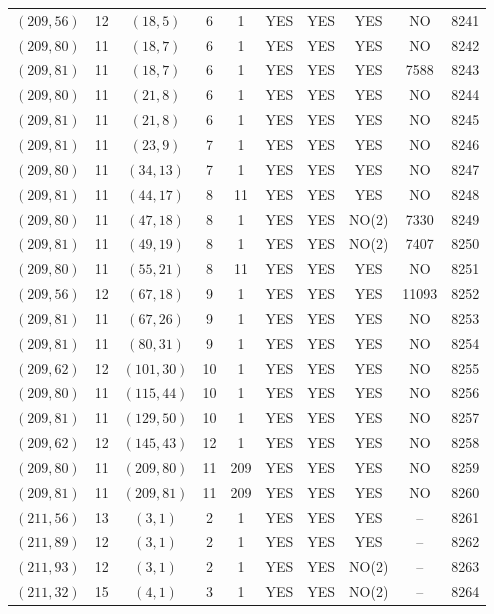 \begin{longtable}{|c|c|c|c|c|c|c|c|c|c|}
$(209, 56)$ & 12 & $(18, 5)$ & 6 & 1 & YES & YES & YES & NO & 8241\\
$(209, 80)$ & 11 & $(18, 7)$ & 6 & 1 & YES & YES & YES & NO & 8242\\
$(209, 81)$ & 11 & $(18, 7)$ & 6 & 1 & YES & YES & YES & 7588 & 8243\\
$(209, 80)$ & 11 & $(21, 8)$ & 6 & 1 & YES & YES & YES & NO & 8244\\
$(209, 81)$ & 11 & $(21, 8)$ & 6 & 1 & YES & YES & YES & NO & 8245\\
$(209, 81)$ & 11 & $(23, 9)$ & 7 & 1 & YES & YES & YES & NO & 8246\\
$(209, 80)$ & 11 & $(34, 13)$ & 7 & 1 & YES & YES & YES & NO & 8247\\
$(209, 81)$ & 11 & $(44, 17)$ & 8 & 11 & YES & YES & YES & NO & 8248\\
$(209, 80)$ & 11 & $(47, 18)$ & 8 & 1 & YES & YES & NO(2) & 7330 & 8249\\
$(209, 81)$ & 11 & $(49, 19)$ & 8 & 1 & YES & YES & NO(2) & 7407 & 8250\\
$(209, 80)$ & 11 & $(55, 21)$ & 8 & 11 & YES & YES & YES & NO & 8251\\
$(209, 56)$ & 12 & $(67, 18)$ & 9 & 1 & YES & YES & YES & 11093 & 8252\\
$(209, 81)$ & 11 & $(67, 26)$ & 9 & 1 & YES & YES & YES & NO & 8253\\
$(209, 81)$ & 11 & $(80, 31)$ & 9 & 1 & YES & YES & YES & NO & 8254\\
$(209, 62)$ & 12 & $(101, 30)$ & 10 & 1 & YES & YES & YES & NO & 8255\\
$(209, 80)$ & 11 & $(115, 44)$ & 10 & 1 & YES & YES & YES & NO & 8256\\
$(209, 81)$ & 11 & $(129, 50)$ & 10 & 1 & YES & YES & YES & NO & 8257\\
$(209, 62)$ & 12 & $(145, 43)$ & 12 & 1 & YES & YES & YES & NO & 8258\\
$(209, 80)$ & 11 & $(209, 80)$ & 11 & 209 & YES & YES & YES & NO & 8259\\
$(209, 81)$ & 11 & $(209, 81)$ & 11 & 209 & YES & YES & YES & NO & 8260\\
$(211, 56)$ & 13 & $(3, 1)$ & 2 & 1 & YES & YES & YES & -- & 8261\\
$(211, 89)$ & 12 & $(3, 1)$ & 2 & 1 & YES & YES & YES & -- & 8262\\
$(211, 93)$ & 12 & $(3, 1)$ & 2 & 1 & YES & YES & NO(2) & -- & 8263\\
$(211, 32)$ & 15 & $(4, 1)$ & 3 & 1 & YES & YES & NO(2) & -- & 8264\\

\end{longtable}
